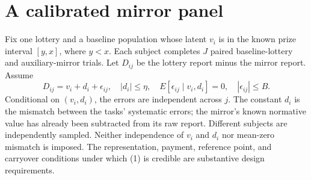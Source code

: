\documentclass[11pt]{article}
\theoremstyle{definition}
\begin{document}
\section*{A calibrated mirror panel}
Fix one lottery and a baseline population whose latent $v_i$ is in the
known prize interval $[y,x]$, where $y<x$. Each subject completes $J$
paired baseline-lottery and auxiliary-mirror trials. Let $D_{ij}$ be the
lottery report minus the mirror report. Assume
\[
 D_{ij}=v_i+d_i+\epsilon_{ij},\quad |d_i|\le\eta,
 \quad E[\epsilon_{ij}\mid v_i,d_i]=0,
 \quad |\epsilon_{ij}|\le B.                              \tag{1}
\]
Conditional on $(v_i,d_i)$, the errors are independent across $j$.
The constant $d_i$ is the mismatch between the tasks' systematic errors;
the mirror's known normative value has already been subtracted from its
raw report. Different subjects are independently sampled. Neither
independence of $v_i$ and $d_i$ nor mean-zero mismatch is imposed.
The representation, payment, reference point, and carryover conditions
under which (1) is credible are substantive design requirements.
\end{document}
